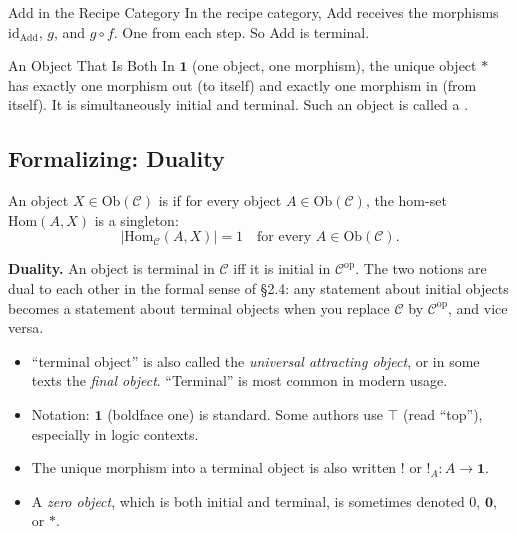 \begin{example}{Add in the Recipe Category}
In the recipe category, Add receives the morphisms $\mathrm{id}_{\mathrm{Add}}$,
$g$, and $g \circ f$. One from each step. So Add is terminal.
\end{example}

\begin{example}{An Object That Is Both}
In $\mathbf{1}$ (one object, one morphism), the unique object $*$ has
exactly one morphism out (to itself) and exactly one morphism in (from
itself). It is simultaneously initial and terminal. Such an object is called
a .
\end{example}

\subsection{Formalizing: Duality}

An object $X \in \mathrm{Ob}(\mathcal{C})$ is  if for every
object $A \in \mathrm{Ob}(\mathcal{C})$, the hom-set $\mathrm{Hom}(A, X)$
is a singleton:
\begin{equation*}
  | \mathrm{Hom}_{\mathcal{C}}(A, X) | = 1
  \quad \text{for every } A \in \mathrm{Ob}(\mathcal{C}).
\end{equation*}

\textbf{Duality.} An object is terminal in $\mathcal{C}$ iff it is initial
in $\mathcal{C}^{\mathrm{op}}$. The two notions are dual to each other in
the formal sense of \S2.4: any statement about initial objects becomes a
statement about terminal objects when you replace $\mathcal{C}$ by
$\mathcal{C}^{\mathrm{op}}$, and vice versa.

\begin{howtosay}
\begin{itemize}
  \item ``terminal object'' is also called the \emph{universal attracting
        object}, or in some texts the \emph{final object}. ``Terminal'' is
        most common in modern usage.
  \item Notation: $\mathbf{1}$ (boldface one) is standard. Some authors
        use $\top$ (read ``top''), especially in logic contexts.
  \item The unique morphism into a terminal object is also written $!$ or
        $!_A : A \to \mathbf{1}$.
  \item A \emph{zero object}, which is both initial and terminal, is
        sometimes denoted $0$, $\mathbf{0}$, or $*$.
\end{itemize}
\end{howtosay}

